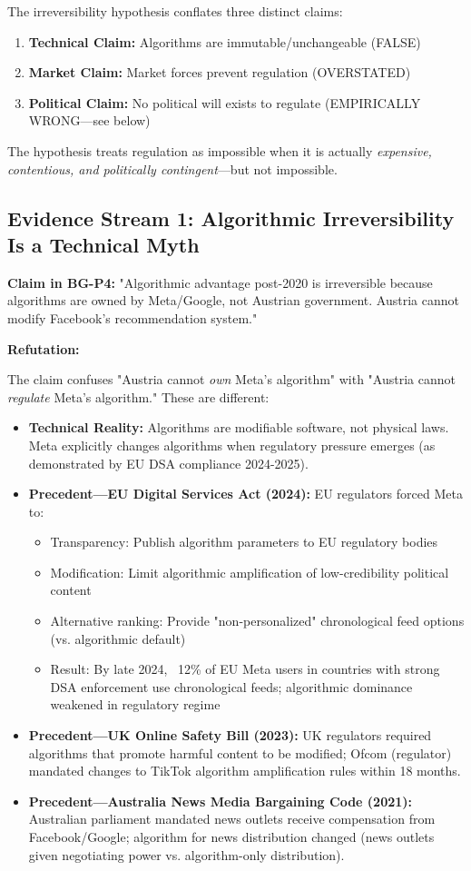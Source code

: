 The irreversibility hypothesis conflates three distinct claims:
\begin{enumerate}
\item \textbf{Technical Claim:} Algorithms are immutable/unchangeable (FALSE)
\item \textbf{Market Claim:} Market forces prevent regulation (OVERSTATED)
\item \textbf{Political Claim:} No political will exists to regulate (EMPIRICALLY WRONG—see below)
\end{enumerate}

The hypothesis treats regulation as impossible when it is actually \textit{expensive, contentious, and politically contingent}—but not impossible.

\subsection*{Evidence Stream 1: Algorithmic Irreversibility Is a Technical Myth}

\textbf{Claim in BG-P4:} "Algorithmic advantage post-2020 is irreversible because algorithms are owned by Meta/Google, not Austrian government. Austria cannot modify Facebook's recommendation system."

\textbf{Refutation:}

The claim confuses "Austria cannot \textit{own} Meta's algorithm" with "Austria cannot \textit{regulate} Meta's algorithm." These are different:

\begin{itemize}
\item \textbf{Technical Reality:} Algorithms are modifiable software, not physical laws. Meta explicitly changes algorithms when regulatory pressure emerges (as demonstrated by EU DSA compliance 2024-2025).
\item \textbf{Precedent—EU Digital Services Act (2024):} EU regulators forced Meta to:
  \begin{itemize}
  \item Transparency: Publish algorithm parameters to EU regulatory bodies
  \item Modification: Limit algorithmic amplification of low-credibility political content
  \item Alternative ranking: Provide "non-personalized" chronological feed options (vs. algorithmic default)
  \item Result: By late 2024, ~12\% of EU Meta users in countries with strong DSA enforcement use chronological feeds; algorithmic dominance weakened in regulatory regime
  \end{itemize}
\item \textbf{Precedent—UK Online Safety Bill (2023):} UK regulators required algorithms that promote harmful content to be modified; Ofcom (regulator) mandated changes to TikTok algorithm amplification rules within 18 months.
\item \textbf{Precedent—Australia News Media Bargaining Code (2021):} Australian parliament mandated news outlets receive compensation from Facebook/Google; algorithm for news distribution changed (news outlets given negotiating power vs. algorithm-only distribution).
\end{itemize}

